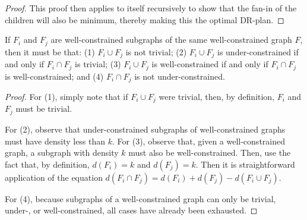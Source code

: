 \begin{proof}
This proof then applies to itself recursively to show that the fan-in of the children will also be minimum, thereby making this the optimal DR-plan.
\end{proof}






\begin{remark}\label{lemma:union_intersection}
If $F_i$ and $F_j$ are well-constrained subgraphs of the same well-constrained graph $F$, then it must be that: (1) $F_i\cup F_j$ is not trivial; (2) $F_i\cup F_j$ is under-constrained if and only if $F_i\cap F_j$ is trivial; (3) $F_i\cup F_j$ is well-constrained if and only if $F_i\cap F_j$ is well-constrained; and (4) $F_i\cap F_j$ is not under-constrained.
\end{remark}

\begin{proof}
For (1), simply note that if $F_i\cup F_j$ were trivial, then, by definition, $F_i$ and $F_j$ must be trivial.

For (2), observe that under-constrained subgraphs of well-constrained graphs must have density less than $k$. For (3), observe that, given a well-constrained graph, a subgraph with density $k$ must also be well-constrained. Then, use the fact that, by definition, $d(F_i)=k$ and $d(F_j)=k$. Then it is straightforward application of the equation $d(F_i\cap F_j)=d(F_i)+d(F_j)-d(F_i\cup F_j)$.

For (4), because subgraphs of a well-constrained graph can only be trivial, under-, or well-constrained, all cases have already been exhausted.
\end{proof}


